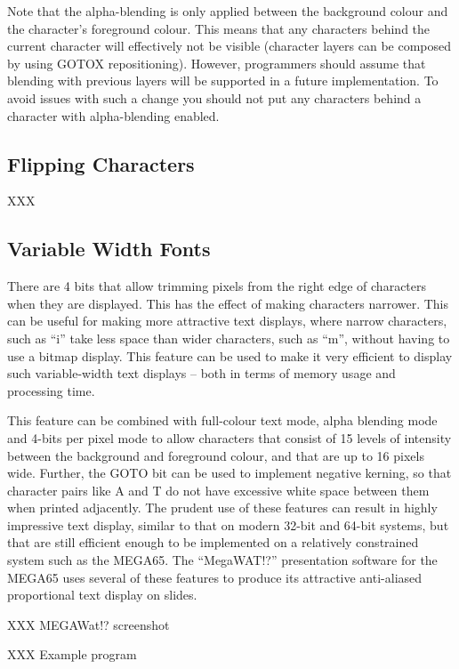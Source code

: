 Note that the alpha-blending is only applied between the background colour and the character's foreground colour. This means that any characters behind the current character will effectively not be visible (character layers can be composed by using GOTOX repositioning). However, programmers should assume that blending with previous layers will be supported in a future implementation. To avoid issues with such a change you should not put any characters behind a character with alpha-blending enabled.



\subsection{Flipping Characters}

XXX

\subsection{Variable Width Fonts}

There are 4 bits that allow trimming pixels from the right edge of characters when they are displayed. This has the effect of making
characters narrower. This can be useful for making more attractive text displays, where narrow characters, such as ``i'' take less space than wider characters, such as ``m'', without having to use a bitmap display. This feature can be used to make it very efficient to display
such variable-width text displays -- both in terms of memory usage and processing time.

This feature can be combined with full-colour text mode, alpha blending mode and 4-bits per pixel mode to allow characters that consist of
15 levels of intensity between the background and foreground colour, and that are up to 16 pixels wide.  Further, the GOTO bit can be used to implement negative kerning, so that character pairs like A and T do not have excessive white space between them when printed adjacently. The prudent use of these features can result in highly impressive text display, similar to that on modern 32-bit and 64-bit systems, but that are still efficient enough to be implemented on a relatively constrained system such as the MEGA65. The ``MegaWAT!?'' presentation software for the MEGA65 uses several of these features to produce its attractive anti-aliased proportional text display on slides.

XXX MEGAWat!? screenshot

XXX Example program

